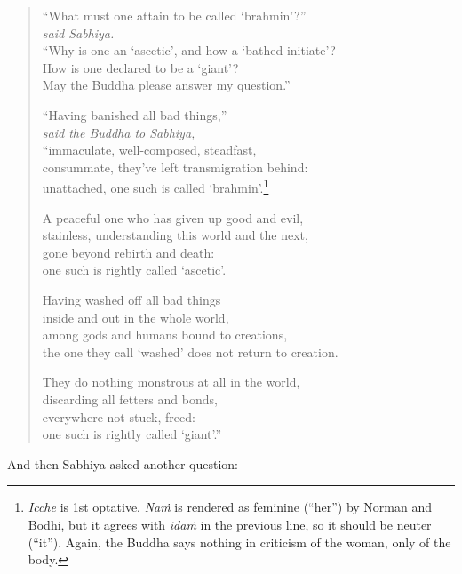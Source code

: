 \documentclass[12pt,openany]{book}%
\newcommand*{\scspeaker}[1]{\hspace{2em}\textit{#1}}
\begin{document}
\begin{verse}%
“What must one attain to be called ‘brahmin’?” \\
\scspeaker{said Sabhiya. }\\
“Why is one an ‘ascetic’, and how a ‘bathed initiate’? \\
How is one declared to be a ‘giant’? \\
May the Buddha please answer my question.” 

“Having banished all bad things,” \\
\scspeaker{said the Buddha to Sabhiya, }\\
“immaculate, well-composed, steadfast, \\
consummate, they’ve left transmigration behind: \\
unattached, one such is called ‘brahmin’.\footnote{\textit{Icche} is 1st optative. \textit{\textsanskrit{Naṁ}} is rendered as feminine (“her”) by Norman and Bodhi, but it agrees with \textit{\textsanskrit{idaṁ}} in the previous line, so it should be neuter (“it”). Again, the Buddha says nothing in criticism of the woman, only of the body. } 

A peaceful one who has given up good and evil, \\
stainless, understanding this world and the next, \\
gone beyond rebirth and death: \\
one such is rightly called ‘ascetic’. 

Having washed off all bad things \\
inside and out in the whole world, \\
among gods and humans bound to creations, \\
the one they call ‘washed’ does not return to creation. 

They do nothing monstrous at all in the world, \\
discarding all fetters and bonds, \\
everywhere not stuck, freed: \\
one such is rightly called ‘giant’.” 

%
\end{verse}

And then Sabhiya asked another question: 
\end{document}
